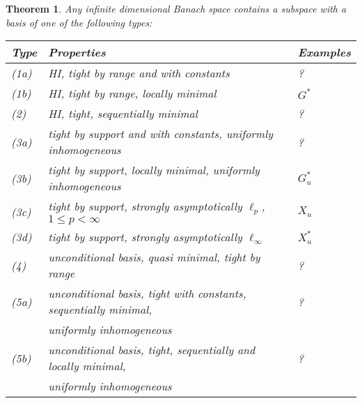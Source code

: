 \documentclass[10pt]{amsart}
\numberwithin{equation}{section}
\newtheorem{thm}{Theorem}[section]
\begin{document}
\begin{thm}\label{final} Any infinite dimensional Banach space contains a subspace with a basis of one of the following types:
\begin{center}
  \begin{tabular}{|l|l|l|}

    \hline

    Type       & Properties                              & Examples                                  \\

    \hline

    (1a)                     & HI, tight by range and with constants    &   ?\\

    (1b)                   & HI, tight by range, locally minimal      & $G^*$\\

    \hline

    (2) & HI, tight, sequentially minimal     &   ? \\

    \hline

    (3a) & tight by support and with constants, uniformly inhomogeneous & ? \\

 (3b) & tight by support, locally minimal, uniformly inhomogeneous & $G_u^*$ \\

 (3c) & tight by support, strongly asymptotically
                             $\ell_p$, $1 {\ensuremath{\leqslant}} p <\infty$ & $X_u$ \\

(3d) & tight by support, strongly asymptotically
                             $\ell_{\infty}$ & $X_u^*$  \\

    \hline

(4) & unconditional basis, quasi minimal, tight by range & ? \\

\hline

(5a) & unconditional basis, tight with constants, sequentially minimal,  & ? \\

     & uniformly inhomogeneous &    \\

(5b) & unconditional basis, tight, sequentially and locally minimal,
& ? \\

     & uniformly inhomogeneous &    \\


\end{tabular}
\end{center}
\end{thm}
\end{document}
